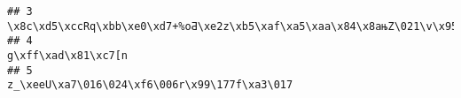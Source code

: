 \documentclass[
]{article}
\begin{document}
\begin{verbatim}
## 3                                                                                                                                                                                                                                                                                                                                                                                                                                                                                                                                                                                                                                                                                                                                                                                       \x8c\xd5\xccRq\xbb\xe0\xd7+%oƋ\xe2z\xb5\xaf\xa5\xaa\x84\x8aњZ\021\v\x95s\xaf\177\x90\xf4\xc2xljС\x9e9\x86.1&P\032\033
## 4                                                                                                                                                                                                                                                                                                                                                                                                                                                                                                                                                                                                                                                                                                                                                                                                                                                                                         g\xff\xad\x81\xc7[n
## 5                                                                                                                                                                                                                                                                                                                                                                                                                                                                                                                                                                                                                                                                                                                                                                                                                                                               z_\xeeU\xa7\016\024\xf6\006r\x99\177f\xa3\017

\end{verbatim}
\end{document}

